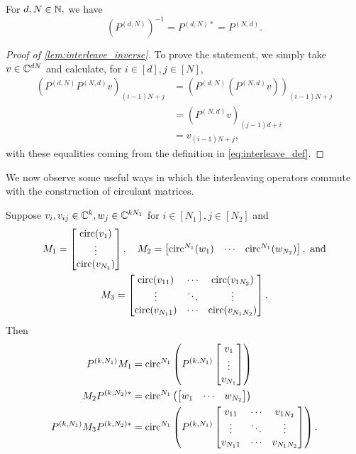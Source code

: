 \begin{lemma}
  For $d, N \in \mathbb{N},$ we have \[(P^{(d, N)})^{-1} = P^{(d, N) *} = P^{(N, d)}.\]
  \label{lem:interleave_inverse}
\end{lemma}

\begin{proof}[Proof of \cref{lem:interleave_inverse}]
  To prove the statement, we simply take $v \in \mathbb{C}^{d N}$ and calculate, for $i \in [d], j \in [N]$,
  \begin{align*}
    (P^{(d, N)} P^{(N, d)} v)_{(i - 1) N + j} &= (P^{(d, N)} (P^{(N, d)} v))_{(i - 1) N + j} \\
    &= (P^{(N, d)} v)_{(j - 1) d + i} \\
    &= v_{(i - 1) N + j},
  \end{align*}
  with these equalities coming from the definition in \eqref{eq:interleave_def}.  
\end{proof}

We now observe some useful ways in which the interleaving operators commute with the construction of circulant matrices.

\begin{lemma}
  Suppose $v_i, v_{ij} \in \mathbb{C}^k, w_j \in \mathbb{C}^{k N_1}$ for $i \in [N_1], j \in [N_2]$ and
  \begin{gather*}
    M_1 = \begin{bmatrix} \operatorname{circ}(v_1) \\ \vdots \\ \operatorname{circ}(v_{N_1}) \end{bmatrix},\quad
    M_2 = \begin{bmatrix} \operatorname{circ}^{N_1}(w_1) & \cdots & \operatorname{circ}^{N_1}(w_{N_2}) \end{bmatrix},\ \text{and} \\
    M_3 = \begin{bmatrix} \operatorname{circ}(v_{11}) & \cdots & \operatorname{circ}(v_{1 N_2}) \\ \vdots & \ddots & \vdots \\ \operatorname{circ}(v_{N_1 1}) & \cdots & \operatorname{circ}(v_{N_1 N_2}) \end{bmatrix}.\end{gather*}
  Then
  \begin{align}
    P^{(k, N_1)} M_1 &= \operatorname{circ}^{N_1}\left(P^{(k, N_1)} \begin{bmatrix} v_1 \\ \vdots \\ v_{N_1} \end{bmatrix}\right) \label{eq:M_1} \\
    M_2 P^{(k, N_2)*} &= \operatorname{circ}^{N_1}\left(\begin{bmatrix} w_1 & \cdots & w_{N_2} \end{bmatrix}\right) \label{eq:M_2} \\
    P^{(k, N_1)}M_3P^{(k, N_2)*} &= \operatorname{circ}^{N_1}\left(P^{(k, N_1)} \begin{bmatrix} v_{11} & \cdots & v_{1 N_2} \\ \vdots & \ddots & \vdots \\ v_{N_1 1} & \cdots & v_{N_1 N_2} \end{bmatrix}\right). \label{eq:M_3}
  \end{align}
  \label{lem:interleave}
\end{lemma}

